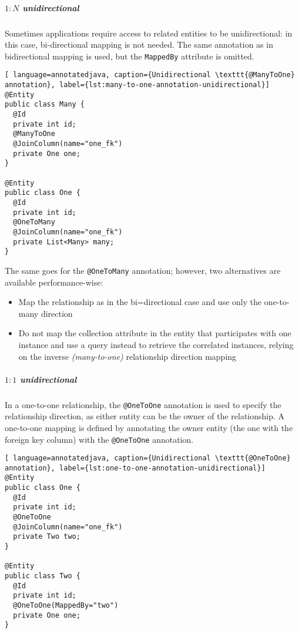 \documentclass[english]{article}
\begin{document}
\begin{onepage}
  \subparagraph*{\(1:N\) unidirectional}

  Sometimes applications require access to related entities to be unidirectional: in this case, bi-directional mapping is not needed.
  The same annotation as in bidirectional mapping is used, but the \texttt{MappedBy} attribute is omitted.

  \begin{lstlisting}[ language=annotatedjava, caption={Unidirectional \texttt{@ManyToOne} annotation}, label={lst:many-to-one-annotation-unidirectional}]
@Entity
public class Many {
  @Id
  private int id;
  @ManyToOne
  @JoinColumn(name="one_fk")
  private One one;
}

@Entity
public class One {
  @Id
  private int id;
  @OneToMany
  @JoinColumn(name="one_fk")
  private List<Many> many;
}
\end{lstlisting}

  The same goes for the \texttt{@OneToMany} annotation;
  however, two alternatives are available performance-wise:

  \begin{itemize}
    \item Map the relationship as in the bi=directional case and use only the one-to-many direction
    \item Do not map the collection attribute in the entity that participates with one instance and use a query instead to retrieve the correlated instances, relying on the inverse \textit{(many-to-one)} relationship direction mapping
  \end{itemize}
\end{onepage}

\begin{onepage}
  \subparagraph*{\(1:1\) unidirectional}
  In a one-to-one relationship, the \texttt{@OneToOne} annotation is used to specify the relationship direction, as either entity can be the owner of the relationship.
  A one-to-one mapping is defined by annotating the owner entity (the one with the foreign key column) with the \texttt{@OneToOne} annotation.

  \begin{lstlisting}[ language=annotatedjava, caption={Unidirectional \texttt{@OneToOne} annotation}, label={lst:one-to-one-annotation-unidirectional}]
@Entity
public class One {
  @Id
  private int id;
  @OneToOne
  @JoinColumn(name="one_fk")
  private Two two;
}

@Entity
public class Two {
  @Id
  private int id;
  @OneToOne(MappedBy="two")
  private One one;
}
\end{lstlisting}
\end{onepage}
\end{document}
